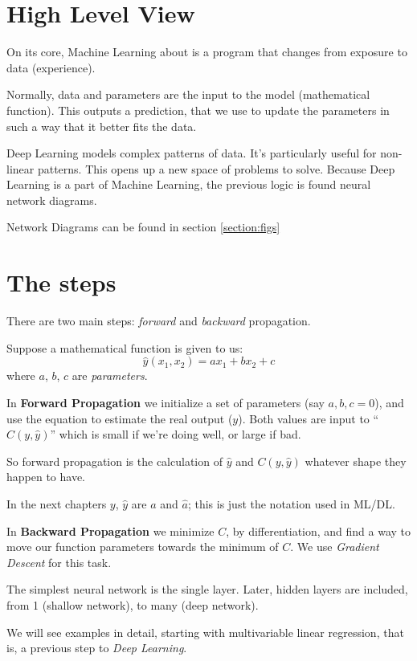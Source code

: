 \section{High Level View}

On its core, Machine Learning about is a program that changes from exposure to data (experience).

Normally, data and parameters are the input to the model (mathematical function). This outputs a prediction, that we use to update the parameters in such a way that it better fits the data.

Deep Learning models complex patterns of data. It's particularly useful for non-linear patterns. This opens up a new space of problems to solve. Because Deep Learning is a part of Machine Learning, the previous logic is found neural network diagrams.

Network Diagrams can be found in section \ref{section:figs} 

\section{The steps}
There are two main steps: \textit{forward} and \textit{backward} propagation. 

Suppose a mathematical function is given to us:
$$ \hat{y}(x_1,x_2) = a x_1 + b x_2 + c$$
where $a$, $b$, $c$ are \textit{parameters}.

In \textbf{Forward Propagation} we initialize a set of parameters (say $a,b,c=0$), and use the equation to estimate the real output ($y$). Both values are input to ``$C(y, \hat{y})$'' which is small if we're doing well, or large if bad. 

So forward propagation is the calculation of $\hat{y}$ and $C(y,\hat{y})$ whatever shape they happen to have. 

In the next chapters $y$, $\hat{y}$ are $a$ and $\hat{a}$; this is just the notation used in ML/DL.

In \textbf{Backward Propagation} we minimize $C$, by differentiation, and find a way to move our function parameters towards the minimum of $C$. We use \textit{Gradient Descent} for this task.

The simplest neural network is the single layer. Later, hidden layers are included, from 1 (shallow network), to many (deep network).

We will see examples in detail, starting with multivariable linear regression, that is, a previous step to \textit{Deep Learning}.

